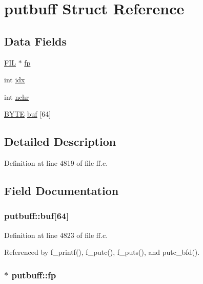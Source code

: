 \hypertarget{structputbuff}{\section{putbuff Struct Reference}
\label{structputbuff}
}
\subsection*{Data Fields}
\begin{DoxyCompactItemize}
\item 
\hyperlink{structFIL}{F\-I\-L} $\ast$ \hyperlink{structputbuff_a5c7baa85e569be17f4888f5d92f4453c}{fp}
\item 
int \hyperlink{structputbuff_a10a3ca93af8df07e9836ebd5230c06d8}{idx}
\item 
int \hyperlink{structputbuff_a125366bfe48077e6f562f95e30b4604a}{nchr}
\item 
\hyperlink{integer_8h_a4ae1dab0fb4b072a66584546209e7d58}{B\-Y\-T\-E} \hyperlink{structputbuff_ae623199e5d2851f95050670170f20329}{buf} \mbox{[}64\mbox{]}
\end{DoxyCompactItemize}


\subsection{Detailed Description}


Definition at line 4819 of file ff.\-c.



\subsection{Field Documentation}
\hypertarget{structputbuff_ae623199e5d2851f95050670170f20329}{
\subsubsection[{buf}]{ putbuff\-::buf\mbox{[}64\mbox{]}}}\label{structputbuff_ae623199e5d2851f95050670170f20329}


Definition at line 4823 of file ff.\-c.



Referenced by f\-\_\-printf(), f\-\_\-putc(), f\-\_\-puts(), and putc\-\_\-bfd().

\hypertarget{structputbuff_a5c7baa85e569be17f4888f5d92f4453c}{
\subsubsection[{fp}]{$\ast$ putbuff\-::fp}}\label{structputbuff_a5c7baa85e569be17f4888f5d92f4453c}


